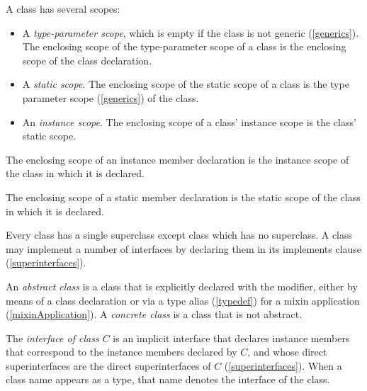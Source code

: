 \documentclass{article}
\begin{document}
\LMHash{}
A class has several scopes:
\begin{itemize}
\item A {\em type-parameter scope}, which is empty if the class is not generic (\ref{generics}).
The enclosing scope of the type-parameter scope of a class is the enclosing scope of the class declaration.
\item A {\em static scope}.
The enclosing scope of the static scope of a class is the type parameter scope (\ref{generics}) of the class.
\item An {\em instance scope}.
The enclosing scope of a class' instance scope is the class' static scope.
\end{itemize}

\LMHash{}
The enclosing scope of an instance member declaration is the instance scope of the class in which it is declared.

\LMHash{}
The enclosing scope of a static member declaration is the static scope of the class in which it is declared.

\LMHash{}
Every class has a single superclass except class  which has no superclass.
A class may implement a number of interfaces by declaring them in its implements clause (\ref{superinterfaces}).

\LMHash{}
An {\em abstract class} is a class that is explicitly declared with the \ABSTRACT{} modifier, either by means of a class declaration or via a type alias (\ref{typedef}) for a mixin application (\ref{mixinApplication}).
A {\em concrete class} is a class that is not abstract.


\LMHash{}
The {\em interface of class $C$} is an implicit interface that declares instance members that correspond to the instance members declared by $C$, and whose direct superinterfaces are the direct superinterfaces of $C$ (\ref{superinterfaces}).
When a class name appears as a type, that name denotes the interface of the class.

\end{document}

